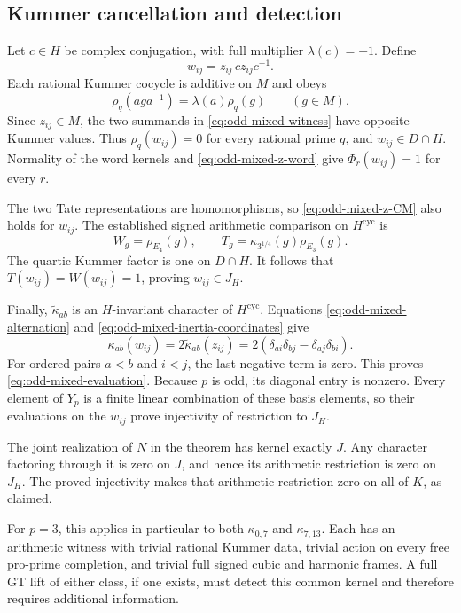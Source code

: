 \subsection{Kummer cancellation and detection}

Let \(c\in H\) be complex conjugation, with full multiplier
\(\lambda(c)=-1\).  Define
\begin{equation}\label{eq:odd-mixed-witness}
                         w_{ij}=z_{ij}\,c z_{ij}c^{-1}.
\end{equation}
Each rational Kummer cocycle is additive on \(M\) and obeys
\[
                  \rho_q(aga^{-1})=\lambda(a)\rho_q(g)
                                  \qquad(g\in M).
\]
Since \(z_{ij}\in M\), the two summands in
\eqref{eq:odd-mixed-witness} have opposite Kummer values.
Thus \(\rho_q(w_{ij})=0\) for every rational prime \(q\),
and \(w_{ij}\in D\cap H\).  Normality of the word kernels
and \eqref{eq:odd-mixed-z-word} give
\(\Phi_r(w_{ij})=1\) for every \(r\).

The two Tate representations are homomorphisms, so
\eqref{eq:odd-mixed-z-CM} also holds for \(w_{ij}\).
The established signed arithmetic comparison on
\(H^{\mathrm{cyc}}\) is
\[
 W_g=\rho_{E_4}(g),\qquad
 T_g=\kappa_{3^{1/4}}(g)\rho_{E_3}(g).
\]
The quartic Kummer factor is one on \(D\cap H\).
It follows that \(T(w_{ij})=W(w_{ij})=1\), proving
\(w_{ij}\in J_H\).

Finally, \(\widetilde\kappa_{ab}\) is an \(H\)-invariant
character of \(H^{\mathrm{cyc}}\).  Equations
\eqref{eq:odd-mixed-alternation} and
\eqref{eq:odd-mixed-inertia-coordinates} give
\[
 \kappa_{ab}(w_{ij})
  =2\widetilde\kappa_{ab}(z_{ij})
  =2(\delta_{ai}\delta_{bj}-\delta_{aj}\delta_{bi}).
\]
For ordered pairs \(a<b\) and \(i<j\), the last negative
term is zero.  This proves \eqref{eq:odd-mixed-evaluation}.
Because \(p\) is odd, its diagonal entry is nonzero.
Every element of \(Y_p\) is a finite linear combination
of these basis elements, so their evaluations on the
\(w_{ij}\) prove injectivity of restriction to \(J_H\).

The joint realization of \(N\) in the theorem has kernel
exactly \(J\).  Any character factoring through it is zero
on \(J\), and hence its arithmetic restriction is zero
on \(J_H\).  The proved injectivity makes that arithmetic
restriction zero on all of \(K\), as claimed.

For \(p=3\), this applies in particular to both
\(\kappa_{0,7}\) and \(\kappa_{7,13}\).  Each has an
arithmetic witness with trivial rational Kummer data,
trivial action on every free pro-prime completion, and
trivial full signed cubic and harmonic frames.  A full GT
lift of either class, if one exists, must detect this
common kernel and therefore requires additional information.
